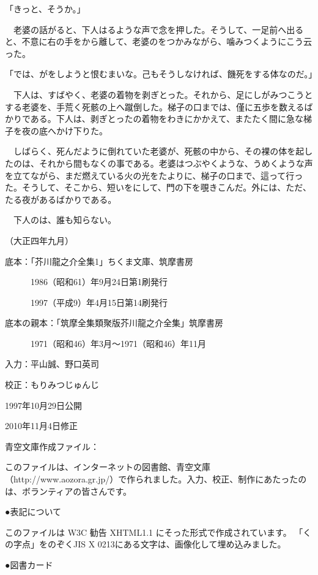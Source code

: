 \documentclass[a4j,twocolumn]{tarticle}
\begin{document}
「きっと、そうか。」\par{}
　老婆の話がると、下人はるような声で念を押した。そうして、一足前へ出ると、不意に右の手をから離して、老婆のをつかみながら、噛みつくようにこう云った。\par{}
「では、がをしようと恨むまいな。己もそうしなければ、饑死をする体なのだ。」\par{}
　下人は、すばやく、老婆の着物を剥ぎとった。それから、足にしがみつこうとする老婆を、手荒く死骸の上へ蹴倒した。梯子の口までは、僅に五歩を数えるばかりである。下人は、剥ぎとったの着物をわきにかかえて、またたく間に急な梯子を夜の底へかけ下りた。\par{}
　しばらく、死んだように倒れていた老婆が、死骸の中から、その裸の体を起したのは、それから間もなくの事である。老婆はつぶやくような、うめくような声を立てながら、まだ燃えている火の光をたよりに、梯子の口まで、這って行った。そうして、そこから、短いをにして、門の下を覗きこんだ。外には、ただ、たる夜があるばかりである。\par{}
　下人のは、誰も知らない。\par{}
（大正四年九月）
\par{}
\par{}
\par{}



\par{}
底本：「芥川龍之介全集1」ちくま文庫、筑摩書房\par{}
　　　1986（昭和61）年9月24日第1刷発行\par{}
　　　1997（平成9）年4月15日第14刷発行\par{}
底本の親本：「筑摩全集類聚版芥川龍之介全集」筑摩書房\par{}
　　　1971（昭和46）年3月～1971（昭和46）年11月\par{}
入力：平山誠、野口英司\par{}
校正：もりみつじゅんじ\par{}
1997年10月29日公開\par{}
2010年11月4日修正\par{}
青空文庫作成ファイル：\par{}
このファイルは、インターネットの図書館、青空文庫（http://www.aozora.gr.jp/）で作られました。入力、校正、制作にあたったのは、ボランティアの皆さんです。\par{}
\par{}
\par{}



\par{}
●表記について\par{}

	このファイルは W3C 勧告 XHTML1.1 にそった形式で作成されています。
	「くの字点」をのぞくJIS X 0213にある文字は、画像化して埋め込みました。




\par{}
●図書カード
\end{document}
